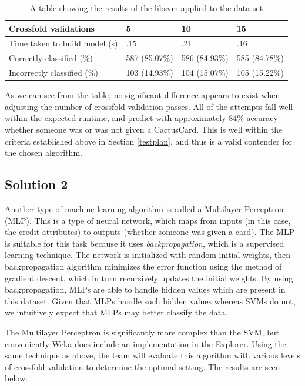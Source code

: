 \documentclass[11pt,journal]{IEEEtran}
\begin{document}
\begin{table}[H]
{\renewcommand{\arraystretch}{1.2}%
\begin{tabular}{ | p{2.5cm} | l | l | l | }
\hline
Crossfold validations         & 5             & 10            & 15            \\ \hline
Time taken to build model (s) & .15           & .21           & .16           \\ \hline
Correctly classified (\%)     & 587 (85.07\%) & 586 (84.93\%) & 585 (84.78\%) \\ \hline
Incorrectly classified (\%)   & 103 (14.93\%) & 104 (15.07\%) & 105 (15.22\%) \\ \hline
\end{tabular}} \quad
\caption{A table showing the results of the libsvm applied to the data set}
\end{table}

As we can see from the table, no significant difference appears to exist when adjusting the number of crossfold validation passes. All of the attempts fall well within the expected runtime, and predict with approximately 84\% accuracy whether someone was or was not given a CactusCard. This is well within the criteria established above in Section \ref{testplan}, and thus is a valid contender for the chosen algorithm.

\subsection{Solution 2}
Another type of machine learning algorithm is called a Multilayer Perceptron (MLP). This is a type of neural network, which maps from inputs (in this case, the credit attributes) to outputs (whether someone was given a card). The MLP is suitable for this task because it uses \emph{backpropagation}, which is a supervised learning technique. The network is initialized with random initial weights, then backpropagation algorithm minimizes the error function using the method of gradient descent, which in turn recursively updates the initial weights. By using backpropagation, MLPs are able to handle hidden values which are present in this dataset. Given that MLPs handle such hidden values whereas SVMs do not, we intuitively expect that MLPs may better classify the data.
\par
The Multilayer Perceptron is significantly more complex than the SVM, but conveniently Weka does include an implementation in the Explorer. Using the same technique as above, the team will evaluate this algorithm with various levels of crossfold validation to determine the optimal setting. The results are seen below:
\end{document}
